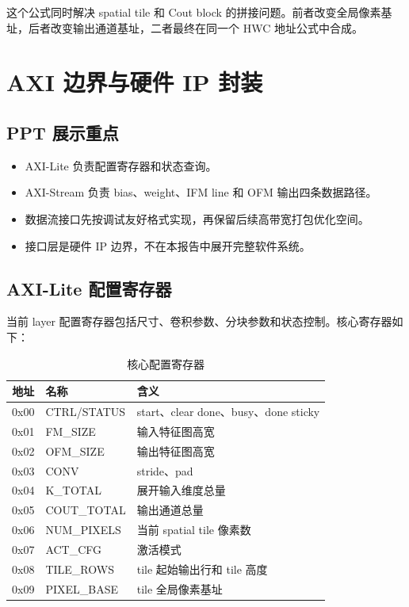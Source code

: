 \documentclass[fontset=fandol,ugly,language=chinese]{pkuthss}
\begin{document}
这个公式同时解决 spatial tile 和 Cout block 的拼接问题。前者改变全局像素基址，后者改变输出通道基址，二者最终在同一个 HWC 地址公式中合成。

\chapter{AXI 边界与硬件 IP 封装}

\section{PPT 展示重点}

\begin{itemize}
    \item AXI-Lite 负责配置寄存器和状态查询。
    \item AXI-Stream 负责 bias、weight、IFM line 和 OFM 输出四条数据路径。
    \item 数据流接口先按调试友好格式实现，再保留后续高带宽打包优化空间。
    \item 接口层是硬件 IP 边界，不在本报告中展开完整软件系统。
\end{itemize}

\section{AXI-Lite 配置寄存器}

当前 layer 配置寄存器包括尺寸、卷积参数、分块参数和状态控制。核心寄存器如下：

\begin{table}[htbp]
\centering
\caption{核心配置寄存器}
\label{tab:reg_report}
\begin{tabular}{cll}
\toprule
\textbf{地址} & \textbf{名称} & \textbf{含义} \\
\midrule
0x00 & CTRL/STATUS & start、clear done、busy、done sticky \\
0x01 & FM\_SIZE & 输入特征图高宽 \\
0x02 & OFM\_SIZE & 输出特征图高宽 \\
0x03 & CONV & stride、pad \\
0x04 & K\_TOTAL & 展开输入维度总量 \\
0x05 & COUT\_TOTAL & 输出通道总量 \\
0x06 & NUM\_PIXELS & 当前 spatial tile 像素数 \\
0x07 & ACT\_CFG & 激活模式 \\
0x08 & TILE\_ROWS & tile 起始输出行和 tile 高度 \\
0x09 & PIXEL\_BASE & tile 全局像素基址 \\
\bottomrule
\end{tabular}
\end{table}
\end{document}
